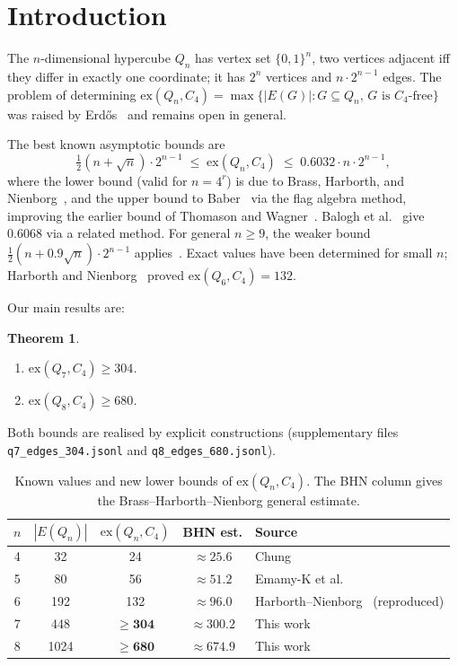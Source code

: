 \documentclass[12pt,a4paper]{article}
\newtheorem{theorem}{Theorem}
\theoremstyle{definition}
\newcommand{\ex}{\mathrm{ex}}
\begin{document}
\section{Introduction}

The $n$-dimensional hypercube $Q_n$ has vertex set $\{0,1\}^n$, two vertices
adjacent iff they differ in exactly one coordinate; it has $2^n$ vertices and
$n\cdot2^{n-1}$ edges.  The problem of determining
$\ex(Q_n,C_4)=\max\{|E(G)|:G\subseteq Q_n,\,G\text{ is }C_4\text{-free}\}$
was raised by Erd\H{o}s~\cite{Erd84} and remains open in general.

The best known asymptotic bounds are
\begin{equation}\label{eq:bounds}
\tfrac{1}{2}(n+\sqrt{n})\cdot2^{n-1}\;\le\;\ex(Q_n,C_4)\;\le\;0.6032\cdot n\cdot2^{n-1},
\end{equation}
where the lower bound (valid for $n=4^r$) is due to Brass, Harborth, and
Nienborg~\cite{BHN95}, and the upper bound to Baber~\cite{Bab12} via the flag
algebra method, improving the earlier bound of Thomason and Wagner~\cite{TW09}.
Balogh et al.~\cite{BHLL12} give 0.6068 via a related method.
For general $n\ge9$, the weaker bound
$\tfrac{1}{2}(n+0.9\sqrt{n})\cdot2^{n-1}$ applies~\cite{BHN95}.
Exact values have been determined for small $n$; Harborth and Nienborg~\cite{HN94}
proved $\ex(Q_6,C_4)=132$.

Our main results are:

\begin{theorem}\label{thm:main}
\begin{enumerate}[label=(\roman*)]
  \item $\ex(Q_7,C_4)\ge304$.
  \item $\ex(Q_8,C_4)\ge680$.
\end{enumerate}
\end{theorem}

Both bounds are realised by explicit constructions (supplementary files
\texttt{q7\_edges\_304.jsonl} and \texttt{q8\_edges\_680.jsonl}).

\begin{table}[ht]
\centering
\caption{Known values and new lower bounds of $\ex(Q_n,C_4)$.
  The BHN column gives the Brass--Harborth--Nienborg general estimate.}
\label{tab:values}\medskip
\begin{tabular}{ccccl}
\toprule
$n$ & $|E(Q_n)|$ & $\ex(Q_n,C_4)$ & BHN est. & Source\\
\midrule
4 &   32 & 24  & $\approx25.6$ & Chung~\cite{Chu92}\\
5 &   80 & 56  & $\approx51.2$ & Emamy-K et al.~\cite{EMR92}\\
6 &  192 & 132 & $\approx96.0$ & Harborth--Nienborg~\cite{HN94} (reproduced)\\
7 &  448 & $\ge\mathbf{304}$ & $\approx300.2$ & This work\\
8 & 1024 & $\ge\mathbf{680}$ & $\approx674.9$ & This work\\
\bottomrule
\end{tabular}
\end{table}
\end{document}
